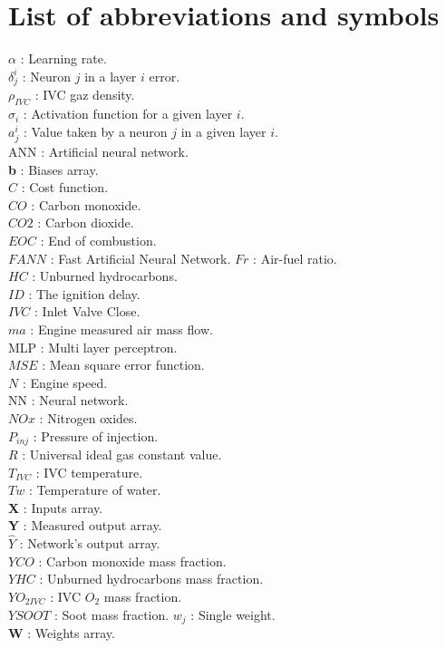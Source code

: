 \documentclass[11pt, a4paper, English]{report}
\begin{document}
\section*{List of abbreviations and symbols}
$\alpha$ : Learning rate. \\
$\delta_j^i$ : Neuron $j$ in a layer $i$ error.\\
$\rho_{IVC}$ : IVC gaz density. \\
$\sigma_i$ : Activation function for a given layer $i$. \\
$a_j^i$ : Value taken by a neuron $j$ in a given layer $i$. \\
ANN : Artificial neural network. \\
\textbf{b} : Biases array.\\
$C$ : Cost function. \\
$CO$ : Carbon monoxide. \\
$CO2$ : Carbon dioxide. \\
$EOC$ : End of combustion. \\
$FANN$ : Fast Artificial Neural Network.
$Fr$ : Air-fuel ratio. \\
$HC$ :  Unburned hydrocarbons. \\
$ID$ : The ignition delay. \\
$IVC$ : Inlet Valve Close. \\
$ma$ : Engine measured air mass flow. \\
MLP : Multi layer perceptron. \\
$MSE$ : Mean square error function. \\
$N$ : Engine speed. \\
NN : Neural network. \\
$NOx$ : Nitrogen oxides. \\
$P_{inj}$ : Pressure of injection. \\
$R$ : Universal ideal gas constant value. \\
$T_{IVC}$ : IVC temperature. \\
$Tw$ : Temperature of water. \\
\textbf{X} : Inputs array. \\
\textbf{Y} : Measured output array. \\
$\hat{Y}$ : Network's output array. \\
$YCO$ : Carbon monoxide mass fraction. \\
$YHC$ : Unburned hydrocarbons mass fraction. \\
$YO_{2IVC}$ : IVC $O_2$ mass fraction. \\
$YSOOT$ : Soot mass fraction.
$w_j$ : Single weight. \\ %
\textbf{W} : Weights array.\\
\color{black}
\end{document}
